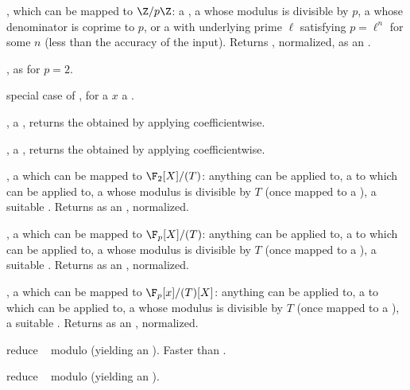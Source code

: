 

,  which can be mapped to
$\Z/p\Z$: a , a  whose modulus is divisible by $p$,
a  whose denominator is coprime to $p$, or a  with
underlying prime $\ell$ satisfying $p = \ell^n$ for some $n$ (less than the
accuracy of the input). Returns , normalized, as an
.

, as  for $p = 2$.

 special case of ,
for a $x$ a .

,  a , returns the
 obtained by applying  coefficientwise.

,  a , returns the
 obtained by applying  coefficientwise.

,  a  which can be
mapped to $\F_2[X]/(T)$: anything  can be applied to,
a  to which  can be applied to, a 
whose modulus is divisible by $T$ (once mapped to a ), a suitable
. Returns  as an , normalized.

,  a  which can be
mapped to $\F_p[X]/(T)$: anything  can be applied to,
a  to which  can be applied to, a 
whose modulus is divisible by $T$ (once mapped to a ), a suitable
. Returns  as an , normalized.

,  a  which can be
mapped to $\F_p[x]/(T)[X]$: anything  can be applied to,
a  to which  can be applied to, a 
whose modulus is divisible by $T$ (once mapped to a ), a suitable
. Returns  as an , normalized.

 reduce ~ modulo 
(yielding an ). Faster than .

 reduce ~ modulo 
(yielding an ).

